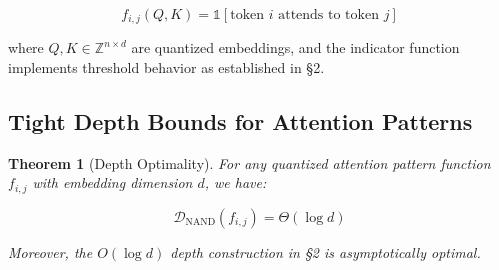 \documentclass[11pt]{article}
\newtheorem{theorem}{Theorem}[section]
\theoremstyle{definition}
\begin{document}
\[






f_{i,j}(Q,K) = \mathbb{1}[\text{token } i \text{ attends to token } j]






\]






where $Q,K \in \mathbb{Z}^{n \times d}$ are quantized embeddings, and the indicator function implements threshold behavior as established in §2.













\subsection{Tight Depth Bounds for Attention Patterns}













\begin{theorem}[Depth Optimality]






For any quantized attention pattern function $f_{i,j}$ with embedding dimension $d$, we have:






\[






\mathcal{D}_{\text{NAND}}(f_{i,j}) = \Theta(\log d)






\]






Moreover, the $O(\log d)$ depth construction in §2 is asymptotically optimal.






\end{theorem}
\end{document}
